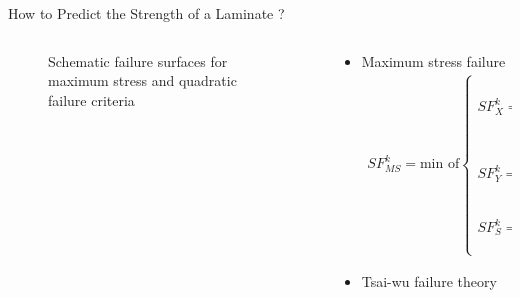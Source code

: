 \documentclass{beamer}
\begin{document}
\begin{frame}{How to Predict the Strength of a Laminate ?\hfill }
\begin{columns}[c]
    \begin{column}{0.4\textwidth}
		\begin{figure}
		\centering
		\caption{Schematic failure surfaces for maximum stress and quadratic failure
		criteria}
		\end{figure}
    \end{column}
    \begin{column}{0.6\textwidth}
		\begin{itemize}
			\item  Maximum stress failure
				\begingroup
				\small
				\begin{align*}
					SF_{MS}^k = \text{min of}
					\begin{cases}
						SF_X^k = 
						\begin{cases}
							\frac{X_t}{\sigma_{11}}, \text{ if } \sigma_{11}>0 \\
							\frac{X_c}{\sigma_{11}}, \text{ if } \sigma_{11}<0 \\
						\end{cases} \\
						SF_Y^k = 
						\begin{cases}
							\frac{Y_t}{\sigma_{22}}, \text{ if } \sigma_{22}>0 \\
							\frac{Y_c}{\sigma_{22}}, \text{ if } \sigma_{22}<0 \\
						\end{cases} \\
						SF_S^k =
						\begin{cases}
							\frac{S}{|\tau_{12}|} \\
						\end{cases} \\
					\end{cases} \textstyle{.}
				\end{align*}
				\endgroup
			\item  Tsai-wu failure theory


\end{itemize}
\end{column}
\end{columns}
\end{frame}
\end{document}
